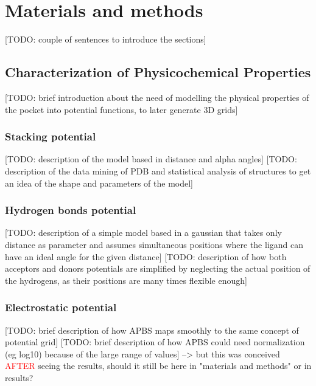 \chapter{Materials and methods} %

[TODO: couple of sentences to introduce the sections]

\section{Characterization of Physicochemical Properties}
  [TODO: brief introduction about the need of modelling the physical properties of the pocket into potential functions, to later generate 3D grids]

  \subsection{Stacking potential}
    [TODO: description of the model based in distance and alpha angles]
    [TODO: description of the data mining of PDB and statistical analysis of structures to get an idea of the shape and parameters of the model]

  \subsection{Hydrogen bonds potential}
    [TODO: description of a simple model based in a gaussian that takes only distance as parameter and assumes simultaneous positions where the ligand can have an ideal angle for the given distance]
    [TODO: description of how both acceptors and donors potentials are simplified by neglecting the actual position of the hydrogens, as their positions are many times flexible enough]

  \subsection{Electrostatic potential}
    [TODO: brief description of how APBS maps smoothly to the same concept of potential grid]
    [TODO: brief description of how APBS could need normalization (eg log10) because of the large range of values] --> but this was conceived
    \textcolor{red}{AFTER} seeing the results, should it still be here in "materials and methods" or in results?


